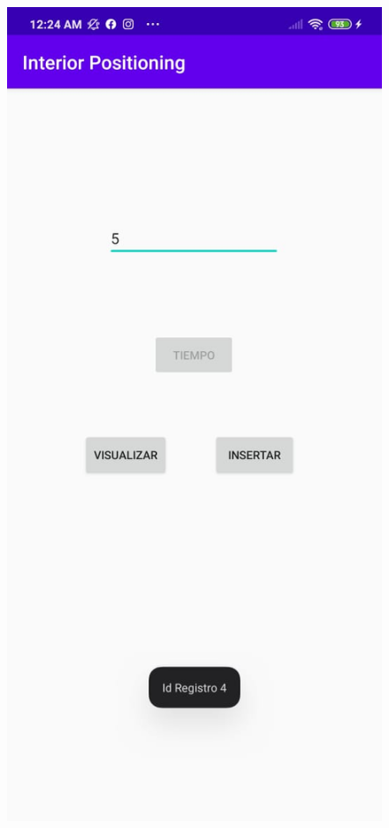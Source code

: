 \documentclass[conference,compsoc,onecolumn]{IEEEtran}
\begin{document}
\begin{figure}[H]
    \centering
    \includegraphics[scale=0.5]{bib/6.PNG}
    \label{fig:1}
\end{figure}
\end{document}
